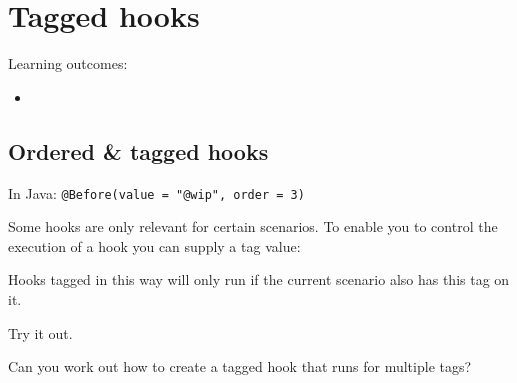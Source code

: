 \chapter*{Tagged hooks}

\ifnotes

    Learning outcomes:
    
    \begin{itemize}
        \item  
    \end{itemize}
    
    \section*{Ordered \& tagged hooks}
    In Java: \texttt{@Before(value = "@wip", order = 3)}

\fi 

\ifcontent 
    Some hooks are only relevant for certain scenarios. To enable you to control the execution of a hook you can supply a tag value:
    
    
    Hooks tagged in this way will only run if the current scenario also has this tag on it.
    
    Try it out.
    
    Can you work out how to create a tagged hook that runs for multiple tags?
    
    
    
\fi